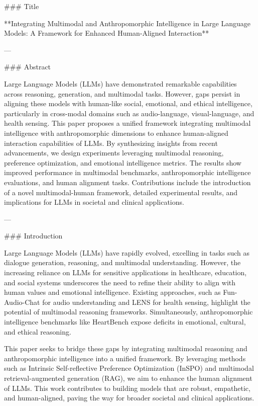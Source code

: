 ### Title

**Integrating Multimodal and Anthropomorphic Intelligence in Large Language Models: A Framework for Enhanced Human-Aligned Interaction**

---

### Abstract

Large Language Models (LLMs) have demonstrated remarkable capabilities across reasoning, generation, and multimodal tasks. However, gaps persist in aligning these models with human-like social, emotional, and ethical intelligence, particularly in cross-modal domains such as audio-language, visual-language, and health sensing. This paper proposes a unified framework integrating multimodal intelligence with anthropomorphic dimensions to enhance human-aligned interaction capabilities of LLMs. By synthesizing insights from recent advancements, we design experiments leveraging multimodal reasoning, preference optimization, and emotional intelligence metrics. The results show improved performance in multimodal benchmarks, anthropomorphic intelligence evaluations, and human alignment tasks. Contributions include the introduction of a novel multimodal-human framework, detailed experimental results, and implications for LLMs in societal and clinical applications.

---

### Introduction

Large Language Models (LLMs) have rapidly evolved, excelling in tasks such as dialogue generation, reasoning, and multimodal understanding. However, the increasing reliance on LLMs for sensitive applications in healthcare, education, and social systems underscores the need to refine their ability to align with human values and emotional intelligence. Existing approaches, such as Fun-Audio-Chat for audio understanding and LENS for health sensing, highlight the potential of multimodal reasoning frameworks. Simultaneously, anthropomorphic intelligence benchmarks like HeartBench expose deficits in emotional, cultural, and ethical reasoning.

This paper seeks to bridge these gaps by integrating multimodal reasoning and anthropomorphic intelligence into a unified framework. By leveraging methods such as Intrinsic Self-reflective Preference Optimization (InSPO) and multimodal retrieval-augmented generation (RAG), we aim to enhance the human alignment of LLMs. This work contributes to building models that are robust, empathetic, and human-aligned, paving the way for broader societal and clinical applications.

